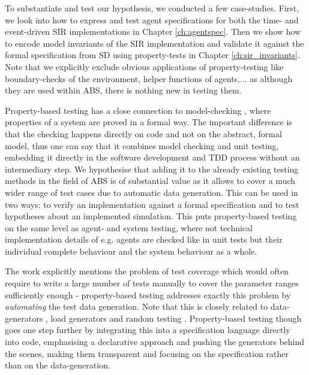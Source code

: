 To substantiate and test our hypothesis, we conducted a few case-studies. First, we look into how to express and test agent specifications for both the time- and event-driven SIR implementations in Chapter \ref{ch:agentspec}. Then we show how to encode model invariants of the SIR implementation and validate it against the formal specification from SD using property-tests in Chapter \ref{ch:sir_invariants}. Note that we explicitly exclude obvious applications of property-testing like boundary-checks of the environment, helper functions of agents,... as although they are used within ABS, there is nothing new in testing them.

\medskip

Property-based testing has a close connection to model-checking \cite{mcmillan_symbolic_1993}, where properties of a system are proved in a formal way. The important difference is that the checking happens directly on code and not on the abstract, formal model, thus one can say that it combines model checking and unit testing, embedding it directly in the software development and TDD process without an intermediary step. We hypothesise that adding it to the already existing testing methods in the field of ABS is of substantial value as it allows to cover a much wider range of test cases due to automatic data generation. This can be used in two ways: to verify an implementation against a formal specification and to test hypotheses about an implemented simulation. This puts property-based testing on the same level as agent- and system testing, where not technical implementation details of e.g. agents are checked like in unit tests but their individual complete behaviour and the system behaviour as a whole.

The work \cite{onggo_test-driven_2016} explicitly mentions the problem of test coverage which would often require to write a large number of tests manually to cover the parameter ranges sufficiently enough - property-based testing addresses exactly this problem by \textit{automating} the test data generation. Note that this is closely related to data-generators \cite{gurcan_generic_2013}, load generators and random testing \cite{burnstein_practical_2010}. Property-based testing though goes one step further by integrating this into a specification language directly into code, emphasising a declarative approach and pushing the generators behind the scenes, making them transparent and focusing on the specification rather than on the data-generation. 